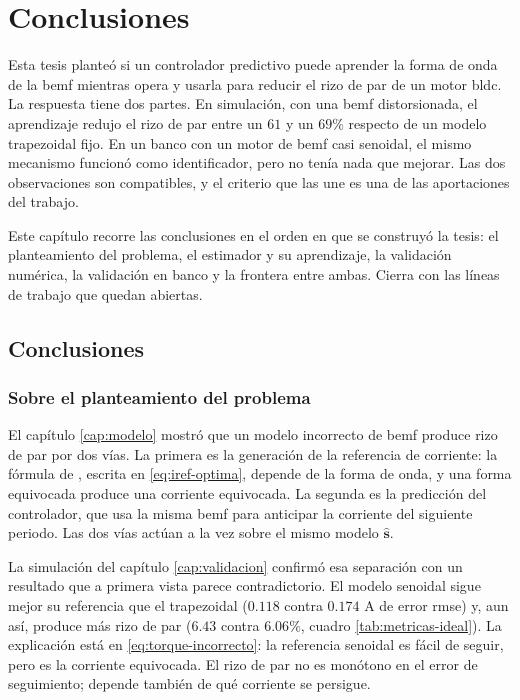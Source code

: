 \documentclass[../../../Tesis_JALS_Maestria.tex]{subfiles}
\begin{document}
\chapter{Conclusiones}
\label{cap:conclusiones}

Esta tesis planteó si un controlador predictivo puede aprender la forma de onda de la \acrshort{bemf} mientras opera y usarla para reducir el rizo de par de un motor \acrshort{bldc}. La respuesta tiene dos partes. En simulación, con una \acrshort{bemf} distorsionada, el aprendizaje redujo el rizo de par entre un $61$ y un $69\%$ respecto de un modelo trapezoidal fijo. En un banco con un motor de \acrshort{bemf} casi senoidal, el mismo mecanismo funcionó como identificador, pero no tenía nada que mejorar. Las dos observaciones son compatibles, y el criterio que las une es una de las aportaciones del trabajo.

Este capítulo recorre las conclusiones en el orden en que se construyó la tesis: el planteamiento del problema, el estimador y su aprendizaje, la validación numérica, la validación en banco y la frontera entre ambas. Cierra con las líneas de trabajo que quedan abiertas.

\section{Conclusiones}
\label{sec:conclusiones}

\subsection{Sobre el planteamiento del problema}

El capítulo \ref{cap:modelo} mostró que un modelo incorrecto de \acrshort{bemf} produce rizo de par por dos vías. La primera es la generación de la referencia de corriente: la fórmula de \citet{lehuy1986minimization}, escrita en \eqref{eq:iref-optima}, depende de la forma de onda, y una forma equivocada produce una corriente equivocada. La segunda es la predicción del controlador, que usa la misma \acrshort{bemf} para anticipar la corriente del siguiente periodo. Las dos vías actúan a la vez sobre el mismo modelo $\hat{\mathbf{s}}$.

La simulación del capítulo \ref{cap:validacion} confirmó esa separación con un resultado que a primera vista parece contradictorio. El modelo senoidal sigue mejor su referencia que el trapezoidal ($0.118$ contra $0.174$ A de error \acrshort{rmse}) y, aun así, produce más rizo de par ($6.43$ contra $6.06\%$, cuadro \ref{tab:metricas-ideal}). La explicación está en \eqref{eq:torque-incorrecto}: la referencia senoidal es fácil de seguir, pero es la corriente equivocada. El rizo de par no es monótono en el error de seguimiento; depende también de qué corriente se persigue.
\end{document}
